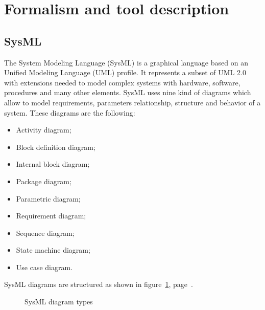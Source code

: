 \documentclass{template/openetcs_report}
\newcommand\refFigure[1]{figure~\ref{#1}, page~\pageref{#1}}
\begin{document}
\section{Formalism and tool description}
\subsection{SysML} \label{SysML}

The System Modeling Language (SysML) is a graphical language based on an Unified Modeling Language (UML) profile. It represents a subset of UML 2.0 with extensions needed to model complex systems with hardware, software, procedures and many other elements. 
SysML uses nine kind of diagrams which allow to model requirements, parameters relationship, structure and behavior of a system. These diagrams are the following:

\begin{itemize}
	\item Activity diagram;
	\item Block definition diagram;
	\item Internal block diagram;
	\item Package diagram;
	\item Parametric diagram;
	\item Requirement diagram;
	\item Sequence diagram;
	\item State machine diagram;
	\item Use case diagram.
\end{itemize}

SysML diagrams are structured as shown in \refFigure{fig:SysML_Diagram_Types}.

\begin{figure}[h]
  \centering
  \caption{SysML diagram types}
  \label{fig:SysML_Diagram_Types}
\end{figure}
\end{document}
